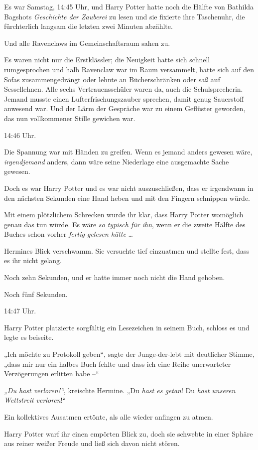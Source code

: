 {Es war Samstag, 14:45 Uhr, und Harry Potter hatte noch die Hälfte von Bathilda Bagshots \emph{Geschichte der Zauberei} zu lesen und sie fixierte ihre Taschenuhr, die fürchterlich langsam die letzten zwei Minuten abzählte.

Und alle Ravenclaws im Gemeinschaftsraum sahen zu.

Es waren nicht nur die Erstklässler; die Neuigkeit hatte sich schnell rumgesprochen und halb Ravenclaw war im Raum versammelt, hatte sich auf den Sofas zusammengedrängt oder lehnte an Bücherschränken oder saß auf Sessellehnen. Alle sechs Vertrauensschüler waren da, auch die Schulsprecherin. Jemand musste einen Lufterfrischungszauber sprechen, damit genug Sauerstoff anwesend war. Und der Lärm der Gespräche war zu einem Geflüster geworden, das nun vollkommener Stille gewichen war.

14:46 Uhr.

Die Spannung war mit Händen zu greifen. Wenn es jemand anders gewesen wäre, \emph{irgendjemand} anders, dann wäre seine Niederlage eine ausgemachte Sache gewesen.

Doch es war Harry Potter und es war nicht auszuschließen, dass er irgendwann in den nächsten Sekunden eine Hand heben und mit den Fingern schnippen würde.

Mit einem plötzlichem Schrecken wurde ihr klar, dass Harry Potter womöglich genau das tun würde. Es wäre \emph{so typisch für ihn}, wenn er die zweite Hälfte des Buches schon vorher \emph{fertig gelesen hätte} …

Hermines Blick verschwamm. Sie versuchte tief einzuatmen und stellte fest, dass es ihr nicht gelang.

Noch zehn Sekunden, und er hatte immer noch nicht die Hand gehoben.

Noch fünf Sekunden.

14:47 Uhr.

Harry Potter platzierte sorgfältig ein Lesezeichen in seinem Buch, schloss es und legte es beiseite.

„Ich möchte zu Protokoll geben“, sagte der Junge-der-lebt mit deutlicher Stimme, „dass mir nur ein halbes Buch fehlte und dass ich eine Reihe unerwarteter Verzögerungen erlitten habe --“

\emph{„Du hast verloren!“}, kreischte Hermine. „Du \emph{hast es getan}! Du \emph{hast unseren Wettstreit verloren}!“

Ein kollektives Ausatmen ertönte, als alle wieder anfingen zu atmen.

Harry Potter warf ihr einen empörten Blick zu, doch sie schwebte in einer Sphäre aus reiner weißer Freude und ließ sich davon nicht stören.

}
